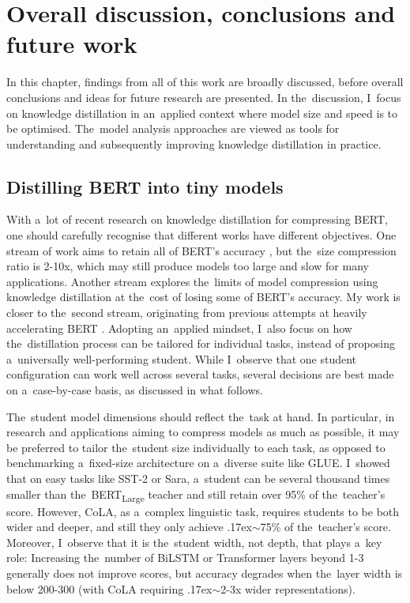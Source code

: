 \documentclass[bsc,frontabs,singlespacing,parskip,deptreport]{infthesis}
\def\mytilde{{\raise.17ex\hbox{$\scriptstyle\sim$}}}
\begin{document}
\chapter{Overall discussion, conclusions and future work}{
  In this chapter, findings from all of this work are broadly discussed, before overall conclusions and ideas for future research are presented.
  In the~discussion, I~focus on knowledge distillation in an~applied context where model size and speed is to be optimised.
  The~model analysis approaches are viewed as tools for understanding and subsequently improving knowledge distillation in practice.

  \section{Distilling BERT into tiny models}{
    With a~lot of recent research on knowledge distillation for compressing BERT, one should carefully recognise that different works have different objectives.
    One stream of work aims to retain all of BERT's accuracy \citep{Sanh_2019,Sun_2019a,Jiao_2019}, but the~size compression ratio is 2-10x, which may still produce models too large and slow for many applications.
    Another stream \citep{Tang_2019a,Tang_2019b} explores the~limits of model compression using knowledge distillation at the~cost of losing some of BERT's accuracy. 
    My work is closer to the~second stream, originating from previous attempts at heavily accelerating BERT \citep{Sucik_2019}.
    Adopting an~applied mindset, I~also focus on how the~distillation process can be tailored for individual tasks, instead of proposing a~universally well-performing student.
    While I~observe that one student configuration can work well across several tasks, several decisions are best made on a~case-by-case basis, as discussed in what follows.

    The~student model dimensions should reflect the~task at hand.
    In particular, in research and applications aiming to compress models as much as possible, it may be preferred to tailor the~student size individually to each task, as opposed to benchmarking a~fixed-size architecture on a~diverse suite like GLUE.
    I~showed that on easy tasks like SST-2 or Sara, a~student can be several thousand times smaller than the~BERT\textsubscript{Large} teacher and still retain over 95\% of the~teacher's score.
    However, CoLA, as a~complex linguistic task, requires students to be both wider and deeper, and still they only achieve \mytilde75\% of the~teacher's score.
    Moreover, I~observe that it is the~student width, not depth, that plays a~key role: 
    Increasing the~number of BiLSTM or Transformer layers beyond 1-3 generally does not improve scores, but accuracy degrades when the~layer width is below 200-300 (with CoLA requiring \mytilde2-3x wider representations).

}}
\end{document}
